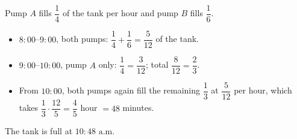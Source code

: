 Pump $A$ fills $\dfrac{1}{4}$ of the tank per hour and pump $B$ fills $\dfrac{1}{6}$.
\begin{itemize}
\item $8{:}00$--$9{:}00$, both pumps: $\dfrac{1}{4}+\dfrac{1}{6}=\dfrac{5}{12}$ of the tank.
\item $9{:}00$--$10{:}00$, pump $A$ only: $\dfrac{1}{4}=\dfrac{3}{12}$; total $\dfrac{8}{12}=\dfrac{2}{3}$.
\item From $10{:}00$, both pumps again fill the remaining $\dfrac{1}{3}$ at $\dfrac{5}{12}$ per hour, which takes $\dfrac{1}{3}\cdot\dfrac{12}{5}=\dfrac{4}{5}$ hour $=48$ minutes.
\end{itemize}
The tank is full at $\boxed{10{:}48\text{ a.m.}}$
